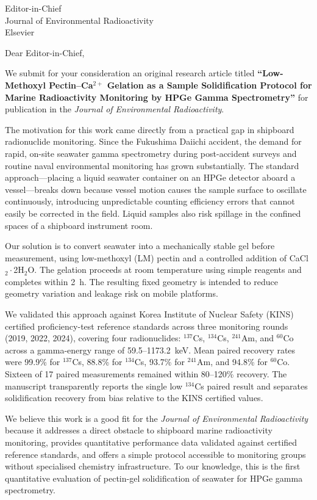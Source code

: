 \documentclass[a4paper,12pt]{letter}
\begin{document}
\begin{letter}{Editor-in-Chief \\
Journal of Environmental Radioactivity \\
Elsevier}

\opening{Dear Editor-in-Chief,}

We submit for your consideration an original research article titled
\textbf{``Low-Methoxyl Pectin--Ca$^{2+}$ Gelation as a Sample
Solidification Protocol for Marine Radioactivity Monitoring by HPGe
Gamma Spectrometry''} for publication in the
\textit{Journal of Environmental Radioactivity}.

The motivation for this work came directly from a practical gap in
shipboard radionuclide monitoring.
Since the Fukushima Daiichi accident, the demand for rapid, on-site
seawater gamma spectrometry during post-accident surveys and routine
naval environmental monitoring has grown substantially.
The standard approach---placing a liquid seawater container on an HPGe
detector aboard a vessel---breaks down because vessel motion causes
the sample surface to oscillate continuously, introducing unpredictable
counting efficiency errors that cannot easily be corrected in the field.
Liquid samples also risk spillage in the confined spaces of a shipboard
instrument room.

Our solution is to convert seawater into a mechanically stable gel
before measurement, using low-methoxyl (LM) pectin and a controlled
addition of CaCl$_2\cdot$2H$_2$O.
The gelation proceeds at room temperature using simple reagents and
completes within 2~h.
The resulting fixed geometry is intended to reduce geometry variation
and leakage risk on mobile platforms.

We validated this approach against Korea Institute of Nuclear Safety
(KINS) certified proficiency-test reference standards across three
monitoring rounds (2019, 2022, 2024), covering four radionuclides:
$^{137}$Cs, $^{134}$Cs, $^{241}$Am, and $^{60}$Co across a
gamma-energy range of 59.5--1173.2~keV.
Mean paired recovery rates were 99.9\% for $^{137}$Cs, 88.8\% for
$^{134}$Cs, 93.7\% for $^{241}$Am, and 94.8\% for $^{60}$Co.
Sixteen of 17 paired measurements remained within 80--120\% recovery.
The manuscript transparently reports the single low $^{134}$Cs paired
result and separates solidification recovery from bias relative to the
KINS certified values.

We believe this work is a good fit for the \textit{Journal of
Environmental Radioactivity} because it addresses a direct obstacle
to shipboard marine radioactivity monitoring, provides quantitative
performance data validated against certified reference standards,
and offers a simple protocol accessible to monitoring groups without
specialised chemistry infrastructure.
To our knowledge, this is the first quantitative evaluation of
pectin-gel solidification of seawater for HPGe gamma spectrometry.


\end{letter}
\end{document}
